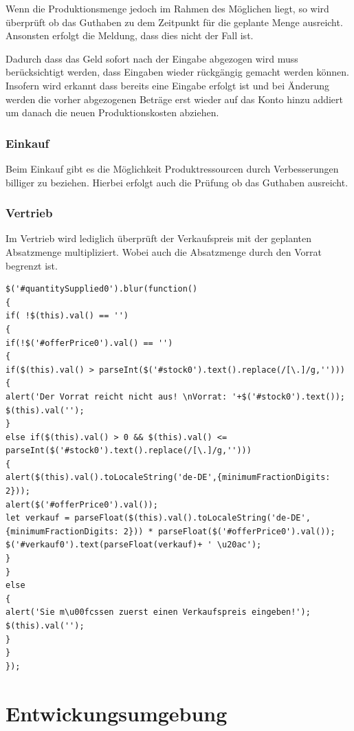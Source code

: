 Wenn die Produktionsmenge jedoch im Rahmen des Möglichen liegt, so wird überprüft ob das Guthaben zu dem Zeitpunkt für die geplante Menge ausreicht. Ansonsten erfolgt die Meldung, dass dies nicht der Fall ist. 

Dadurch dass das Geld sofort nach der Eingabe abgezogen wird muss berücksichtigt werden, dass Eingaben wieder rückgängig gemacht werden können. Insofern wird erkannt dass bereits eine Eingabe erfolgt ist und bei Änderung werden die vorher abgezogenen Beträge erst wieder auf das Konto hinzu addiert um danach die neuen Produktionskosten abziehen.

\subsection*{Einkauf}

Beim Einkauf gibt es die Möglichkeit Produktressourcen durch Verbesserungen billiger zu beziehen. Hierbei erfolgt auch die Prüfung ob das Guthaben ausreicht.

\subsection*{Vertrieb}

Im Vertrieb wird lediglich überprüft der Verkaufspreis mit der geplanten Absatzmenge multipliziert. Wobei auch die Absatzmenge durch den Vorrat begrenzt ist.

\lstset{language=Java}
\begin{lstlisting}
$('#quantitySupplied0').blur(function()
{
if( !$(this).val() == '')
{
if(!$('#offerPrice0').val() == '')
{
if($(this).val() > parseInt($('#stock0').text().replace(/[\.]/g,'')))
{
alert('Der Vorrat reicht nicht aus! \nVorrat: '+$('#stock0').text());
$(this).val('');
}
else if($(this).val() > 0 && $(this).val() <= parseInt($('#stock0').text().replace(/[\.]/g,'')))
{
alert($(this).val().toLocaleString('de-DE',{minimumFractionDigits: 2}));
alert($('#offerPrice0').val());
let verkauf = parseFloat($(this).val().toLocaleString('de-DE',{minimumFractionDigits: 2})) * parseFloat($('#offerPrice0').val());
$('#verkauf0').text(parseFloat(verkauf)+ ' \u20ac');
}
}
else
{
alert('Sie m\u00fcssen zuerst einen Verkaufspreis eingeben!');
$(this).val('');
}
}
});
\end{lstlisting}

\clearpage
\chapter{Entwickungsumgebung}
